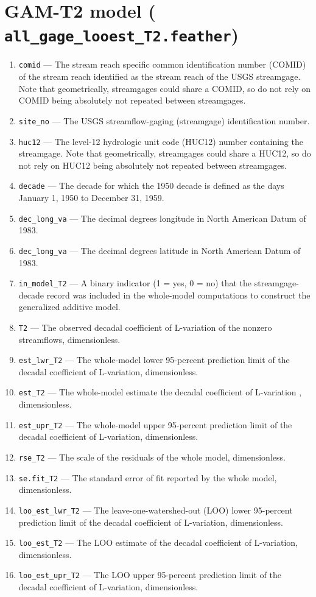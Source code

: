 \documentclass[1p, authoryear, 11pt, times, preprint]{elsarticle}
\newcommand{\code}[1]{{\color{black}%
                       \mbox{\lstinline[basicstyle={\small\ttfamily},
                                        keywordstyle=\scriptsize\ttfamily]|#1|}}}
\begin{document}
\section{GAM-T2 model (\code{all_gage_looest_T2.feather})}
\begin{enumerate}
\footnotesize
\RaggedRight
\item \code{comid} --- The stream reach specific common identification number (COMID) of the stream reach identified as the stream reach of the USGS streamgage. Note that geometrically, streamgages could share a COMID, so do not rely on COMID being absolutely not repeated between streamgages.
\item \code{site_no} --- The USGS streamflow-gaging (streamgage) identification number.
\item \code{huc12} --- The level-12 hydrologic unit code (HUC12) number containing the streamgage. Note that geometrically, streamgages could share a HUC12, so do not rely on HUC12 being absolutely not repeated between streamgages.
\item \code{decade} --- The decade for which the 1950 decade is defined as the days January 1, 1950 to December 31, 1959.
\item \code{dec_long_va} --- The decimal degrees longitude in North American Datum of 1983.
\item \code{dec_long_va} --- The decimal degrees latitude in North American Datum of 1983.
\item \code{in_model_T2} --- A binary indicator (1 = yes, 0 = no) that the streamgage-decade record was included in the whole-model computations to construct the generalized additive model.
\item \code{T2} --- The observed decadal coefficient of L-variation of the nonzero streamflows, dimensionless.
\item \code{est_lwr_T2} --- The whole-model lower 95-percent prediction limit of the decadal coefficient of L-variation, dimensionless.
\item \code{est_T2} --- The whole-model estimate the decadal coefficient of L-variation , dimensionless.
\item \code{est_upr_T2} --- The whole-model upper 95-percent prediction limit of the decadal coefficient of L-variation, dimensionless.
\item \code{rse_T2} --- The scale of the residuals of the whole model, dimensionless.
\item \code{se.fit_T2} --- The standard error of fit reported by the whole model, dimensionless.
\item \code{loo_est_lwr_T2} --- The leave-one-watershed-out (LOO) lower 95-percent prediction limit of the decadal coefficient of L-variation, dimensionless.
\item \code{loo_est_T2} --- The LOO estimate of the decadal coefficient of L-variation, dimensionless.
\item \code{loo_est_upr_T2} --- The LOO upper 95-percent prediction limit of the decadal coefficient of L-variation, dimensionless.
\end{enumerate}
\end{document}

